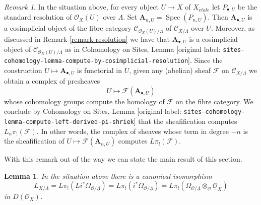 \documentclass[10pt,a4paper]{article}
\theoremstyle{plain}
\newtheorem{lemma}[subsection]{Lemma}
\theoremstyle{definition}
\theoremstyle{remark}
\newtheorem{remark}[subsection]{Remark}
\numberwithin{equation}{subsection}
\def\Spec{\mathop{\mathrm{Spec}}}
\def\etale{{\acute{e}tale}}
\begin{document}
\begin{remark}
\label{remark-compute-L-pi-shriek-spaces}
In the situation above, for every object $U \to X$ of $X_\etale$
let $P_{\bullet, U}$ be the standard resolution of $\mathcal{O}_X(U)$
over $\Lambda$. Set $\mathbf{A}_{n, U} = \Spec(P_{n, U})$.
Then $\mathbf{A}_{\bullet, U}$
is a cosimplicial object of the fibre category
$\mathcal{C}_{\mathcal{O}_X(U)/\Lambda}$ of
$\mathcal{C}_{X/\Lambda}$ over $U$. Moreover, as discussed
in Remark \ref{remark-resolution} we have that $\mathbf{A}_{\bullet, U}$
is a cosimplicial object of $\mathcal{C}_{\mathcal{O}_X(U)/\Lambda}$
as in Cohomology on Sites, Lemma
\textnormal{[original label: \nolinkurl{sites-cohomology-lemma-compute-by-cosimplicial-resolution}]}.
Since the construction $U \mapsto \mathbf{A}_{\bullet, U}$ is functorial
in $U$, given any (abelian) sheaf $\mathcal{F}$ on $\mathcal{C}_{X/\Lambda}$
we obtain a complex of presheaves
$$
U \longmapsto \mathcal{F}(\mathbf{A}_{\bullet, U})
$$
whose cohomology groups compute the homology of $\mathcal{F}$ on the fibre
category. We conclude by
Cohomology on Sites, Lemma
\textnormal{[original label: \nolinkurl{sites-cohomology-lemma-compute-left-derived-pi-shriek}]}
that the sheafification computes $L_n\pi_!(\mathcal{F})$.
In other words, the complex of sheaves whose term in degree $-n$ is
the sheafification of $U \mapsto \mathcal{F}(\mathbf{A}_{n, U})$ computes
$L\pi_!(\mathcal{F})$.
\end{remark}

\noindent
With this remark out of the way we can state the main
result of this section.

\begin{lemma}
\label{lemma-cotangent-morphism-spaces}
In the situation above there is a canonical isomorphism
$$
L_{X/\Lambda} = 
L\pi_!(Li^*\Omega_{\mathcal{O}/\underline{\Lambda}}) =
L\pi_!(i^*\Omega_{\mathcal{O}/\underline{\Lambda}}) =
L\pi_!(\Omega_{\mathcal{O}/\underline{\Lambda}}
\otimes_\mathcal{O} \underline{\mathcal{O}}_X)
$$
in $D(\mathcal{O}_X)$.
\end{lemma}
\end{document}

